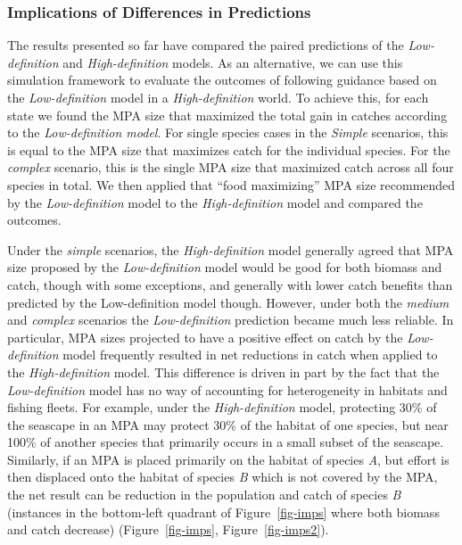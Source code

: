 \documentclass[
  default,
  lineno,
  referee]{sn-jnl}
\begin{document}
\subsubsection{Implications of Differences in
Predictions}\label{sec-imps}

The results presented so far have compared the paired predictions of the
\emph{Low-definition} and \emph{High-definition} models. As an
alternative, we can use this simulation framework to evaluate the
outcomes of following guidance based on the \emph{Low-definition} model
in a \emph{High-definition} world. To achieve this, for each state we
found the MPA size that maximized the total gain in catches according to
the \emph{Low-definition model}. For single species cases in the
\emph{Simple} scenarios, this is equal to the MPA size that maximizes
catch for the individual species. For the \emph{complex} scenario, this
is the single MPA size that maximized catch across all four species in
total. We then applied that ``food maximizing'' MPA size recommended by
the \emph{Low-definition} model to the \emph{High-definition} model and
compared the outcomes.

Under the \emph{simple} scenarios, the \emph{High-definition} model
generally agreed that MPA size proposed by the \emph{Low-definition}
model would be good for both biomass and catch, though with some
exceptions, and generally with lower catch benefits than predicted by
the Low-definition model though. However, under both the \emph{medium}
and \emph{complex} scenarios the \emph{Low-definition} prediction became
much less reliable. In particular, MPA sizes projected to have a
positive effect on catch by the \emph{Low-definition} model frequently
resulted in net reductions in catch when applied to the
\emph{High-definition} model. This difference is driven in part by the
fact that the \emph{Low-definition} model has no way of accounting for
heterogeneity in habitats and fishing fleets. For example, under the
\emph{High-definition} model, protecting 30\% of the seascape in an MPA
may protect 30\% of the habitat of one species, but near 100\% of
another species that primarily occurs in a small subset of the seascape.
Similarly, if an MPA is placed primarily on the habitat of species
\emph{A}, but effort is then displaced onto the habitat of species
\emph{B} which is not covered by the MPA, the net result can be
reduction in the population and catch of species \emph{B} (instances in
the bottom-left quadrant of Figure~\ref{fig-imps} where both biomass and
catch decrease) (Figure~\ref{fig-imps}, Figure~\ref{fig-imps2}).
\end{document}
